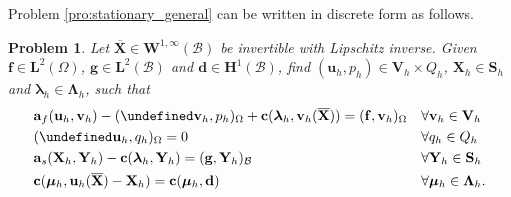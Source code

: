 \documentclass[oneside]{amsart} %
\newtheorem{pro}{Problem}
\let\div\undefined\DeclareMathOperator{\div}{div} %
\newcommand\Hub{\mathbf{H}^1(\B)} %
\newcommand\LdBd{\mathbf{L}^2(\B)} %
\newcommand\LdOd{\mathbf{L}^2(\Omega)} %
\newcommand\Winftyd{\mathbf{W}^{1,\infty}(\B)}
\newcommand\B{\mathcal B} %
\renewcommand\u{\mathbf{u}} %
\renewcommand\a{\mathbf{a}} %
\renewcommand\v{\mathbf{v}} %
\renewcommand\d{\mathbf{d}} %
\renewcommand\c{\mathbf{c}} %
\newcommand\f{\mathbf{f}} %
\newcommand\g{\mathbf{g}} %
\renewcommand\S{\mathbf{S}} %
\newcommand\X{\mathbf{X}} %
\newcommand\Xbar{\overline{\X}} %
\newcommand\Y{\mathbf{Y}} %
\newcommand\LL{{\boldsymbol{\Lambda}}} %
\newcommand\Vline{\mathbf{V}} %
\newcommand\Sline{\S} %
\newcommand\llambda{\boldsymbol\lambda} %
\newcommand\mmu{{\boldsymbol\mu}} %
\begin{document}
	Problem \ref{pro:stationary_general} can be written in discrete form as follows.
	\begin{pro}
		\label{pro:discrte_stationary_general}
		Let $\Xbar\in\Winftyd$ be invertible with Lipschitz inverse. Given $\f\in \LdOd$, $\g\in \LdBd$ and $\d\in \Hub$, find $(\u_h,p_h)\in\Vline_h \times Q_h$, $\X_h\in \Sline_h$ and $\llambda_h\in \LL_h$, such that
		\begin{subequations}
			\begin{align}
				&\a_f(\u_h,\v_h)-(\div\v_h,p_h)_\Omega+\c(\llambda_h,\v_h(\Xbar))=(\f,\v_h)_\Omega && %
				\forall\v_h\in\Vline_h\\
				&(\div\u_h,q_h)_\Omega=0&&\forall q_h\in Q_h\\
				& \a_s(\X_h,\Y_h)-\c(\llambda_h,\Y_h)=(\g,\Y_h)_\B&&\forall\Y_h\in \Sline_h \\
				& \c(\mmu_h,\u_h(\Xbar)-\X_h)=\c(\mmu_h,\d)&&\forall\mmu_h\in \LL_h.
			\end{align}
		\end{subequations}
	\end{pro}
	
\end{document}

